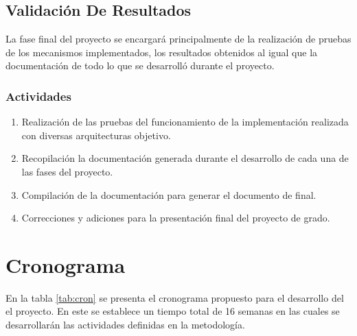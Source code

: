 \documentclass[12pt]{article}
\begin{document}
    \subsection{Validación De Resultados}
    
    La fase final del proyecto se encargará principalmente de la realización de pruebas de los mecanismos implementados, los resultados obtenidos al igual que la documentación de todo lo que se desarrolló durante el proyecto.
    
    \subsubsection*{Actividades}
    
   \begin{enumerate}[label=\thesubsection.\arabic*., wide, labelindent=2em, leftmargin=5em]
        \item Realización de las pruebas del funcionamiento de la implementación realizada con diversas arquitecturas objetivo.
        \item Recopilación la documentación generada durante el desarrollo de cada una de las fases del proyecto.
        \item Compilación de la documentación para generar el documento de final.
        \item Correcciones y adiciones para la presentación final del proyecto de grado.
    \end{enumerate}  


    \section{Cronograma}

    En la tabla \ref{tab:cron} se presenta el cronograma propuesto para el desarrollo del el proyecto. En este se establece un tiempo total de 16 semanas en las cuales se desarrollarán las actividades definidas en la metodología.
\end{document}
